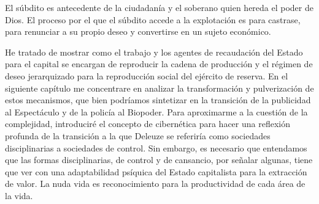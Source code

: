 El súbdito es antecedente de la ciudadanía y el soberano quien hereda el poder de Dios. El proceso por el que el súbdito accede a la explotación es para castrase, para renunciar a su propio deseo y convertirse en un sujeto económico.

He tratado de mostrar como el trabajo y los agentes de recaudación del Estado para el capital se encargan de reproducir la cadena de producción y el régimen de deseo jerarquizado para la reproducción social del ejército de reserva. En el siguiente capítulo me concentrare en analizar la transformación y pulverización de estos mecanismos, que bien podríamos sintetizar en la transición de la publicidad al Espectáculo y de la policía al Biopoder. Para aproximarme a la cuestión de la complejidad, introduciré el concepto de cibernética para hacer una reflexión profunda de la transición a la que Deleuze se referiría como sociedades disciplinarias a sociedades de control. Sin embargo, es necesario que entendamos que las formas disciplinarias, de control y de cansancio, por señalar algunas, tiene que ver con una adaptabilidad psíquica del Estado capitalista para la extracción de valor. La nuda vida es reconocimiento para la productividad de cada área de la vida.